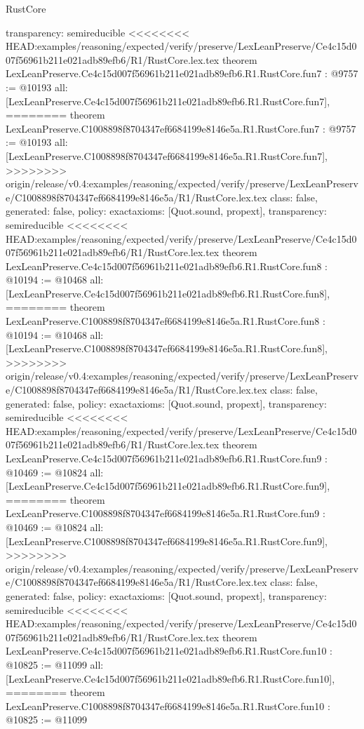 \begin{lexlean}{RustCore}
\begin{coremodule}
{\begin{coremodule}
{{{{{{{{{{  transparency: semireducible
}
<<<<<<<< HEAD:examples/reasoning/expected/verify/preserve/LexLeanPreserve/Ce4c15d007f56961b211e021adb89efb6/R1/RustCore.lex.tex
theorem LexLeanPreserve.Ce4c15d007f56961b211e021adb89efb6.R1.RustCore.fun7 : @9757 := @10193 {
  all: [LexLeanPreserve.Ce4c15d007f56961b211e021adb89efb6.R1.RustCore.fun7],
========
theorem LexLeanPreserve.C1008898f8704347ef6684199e8146e5a.R1.RustCore.fun7 : @9757 := @10193 {
  all: [LexLeanPreserve.C1008898f8704347ef6684199e8146e5a.R1.RustCore.fun7],
>>>>>>>> origin/release/v0.4:examples/reasoning/expected/verify/preserve/LexLeanPreserve/C1008898f8704347ef6684199e8146e5a/R1/RustCore.lex.tex
  class: false,
  generated: false,
  policy: exact{axioms: [Quot.sound, propext]},
  transparency: semireducible
}
<<<<<<<< HEAD:examples/reasoning/expected/verify/preserve/LexLeanPreserve/Ce4c15d007f56961b211e021adb89efb6/R1/RustCore.lex.tex
theorem LexLeanPreserve.Ce4c15d007f56961b211e021adb89efb6.R1.RustCore.fun8 : @10194 := @10468 {
  all: [LexLeanPreserve.Ce4c15d007f56961b211e021adb89efb6.R1.RustCore.fun8],
========
theorem LexLeanPreserve.C1008898f8704347ef6684199e8146e5a.R1.RustCore.fun8 : @10194 := @10468 {
  all: [LexLeanPreserve.C1008898f8704347ef6684199e8146e5a.R1.RustCore.fun8],
>>>>>>>> origin/release/v0.4:examples/reasoning/expected/verify/preserve/LexLeanPreserve/C1008898f8704347ef6684199e8146e5a/R1/RustCore.lex.tex
  class: false,
  generated: false,
  policy: exact{axioms: [Quot.sound, propext]},
  transparency: semireducible
}
<<<<<<<< HEAD:examples/reasoning/expected/verify/preserve/LexLeanPreserve/Ce4c15d007f56961b211e021adb89efb6/R1/RustCore.lex.tex
theorem LexLeanPreserve.Ce4c15d007f56961b211e021adb89efb6.R1.RustCore.fun9 : @10469 := @10824 {
  all: [LexLeanPreserve.Ce4c15d007f56961b211e021adb89efb6.R1.RustCore.fun9],
========
theorem LexLeanPreserve.C1008898f8704347ef6684199e8146e5a.R1.RustCore.fun9 : @10469 := @10824 {
  all: [LexLeanPreserve.C1008898f8704347ef6684199e8146e5a.R1.RustCore.fun9],
>>>>>>>> origin/release/v0.4:examples/reasoning/expected/verify/preserve/LexLeanPreserve/C1008898f8704347ef6684199e8146e5a/R1/RustCore.lex.tex
  class: false,
  generated: false,
  policy: exact{axioms: [Quot.sound, propext]},
  transparency: semireducible
}
<<<<<<<< HEAD:examples/reasoning/expected/verify/preserve/LexLeanPreserve/Ce4c15d007f56961b211e021adb89efb6/R1/RustCore.lex.tex
theorem LexLeanPreserve.Ce4c15d007f56961b211e021adb89efb6.R1.RustCore.fun10 : @10825 := @11099 {
  all: [LexLeanPreserve.Ce4c15d007f56961b211e021adb89efb6.R1.RustCore.fun10],
========
theorem LexLeanPreserve.C1008898f8704347ef6684199e8146e5a.R1.RustCore.fun10 : @10825 := @11099 {
}}}}}}}}}}}}}}
\end{coremodule}}
\end{coremodule}
\end{lexlean}

